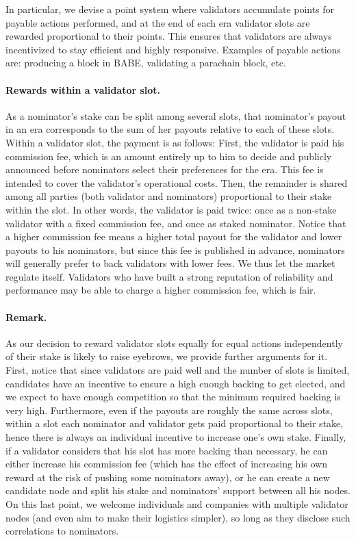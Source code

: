 In particular, we devise a point system where validators accumulate points for payable actions performed, 
and at the end of each era validator slots are rewarded proportional to their points. 
This ensures that validators are always incentivized to stay efficient and highly responsive.
Examples of payable actions are: producing a block in BABE, validating a parachain block, etc.

\paragraph{Rewards within a validator slot.} As a nominator's stake can be split among several slots, 
that nominator's payout in an era corresponds to the sum of her payouts relative to each of these slots. 
Within a validator slot, the payment is as follows: 
First, the validator is paid his commission fee, which is an amount entirely up to him to decide and 
publicly announced before nominators select their preferences for the era. 
This fee is intended to cover the validator's operational costs. 
Then, the remainder is shared among all parties (both validator and nominators) proportional to their stake within the slot. 
In other words, the validator is paid twice: once as a non-stake validator with a fixed commission fee, and once as staked nominator. 
Notice that a higher commission fee means a higher total payout for the validator and lower payouts to his nominators, 
but since this fee is published in advance, nominators will generally prefer to back validators with lower fees. 
We thus let the market regulate itself. Validators who have built a strong reputation of reliability and performance 
may be able to charge a higher commission fee, which is fair.

\paragraph{Remark.} As our decision to reward validator slots equally for equal actions independently of their stake 
is likely to raise eyebrows, we provide further arguments for it. 
First, notice that since validators are paid well and the number of slots is limited, 
 candidates have an incentive to ensure a high enough backing to get elected, 
and we expect to have enough competition so that the minimum required backing is very high. 
Furthermore, even if the payouts are roughly the same across slots, within a slot each nominator and validator 
gets paid proportional to their stake, hence there is always an individual incentive to increase one's own stake. 
Finally, if a validator considers that his slot has more backing than necessary, he can either increase his 
commission fee (which has the effect of increasing his own reward at the risk of pushing some nominators away),
or he can create a new candidate node and split his stake and nominators' support between all his nodes. 
On this last point, we welcome individuals and companies with multiple validator nodes (and even aim to make their 
logistics simpler), so long as they disclose such correlations to nominators.


